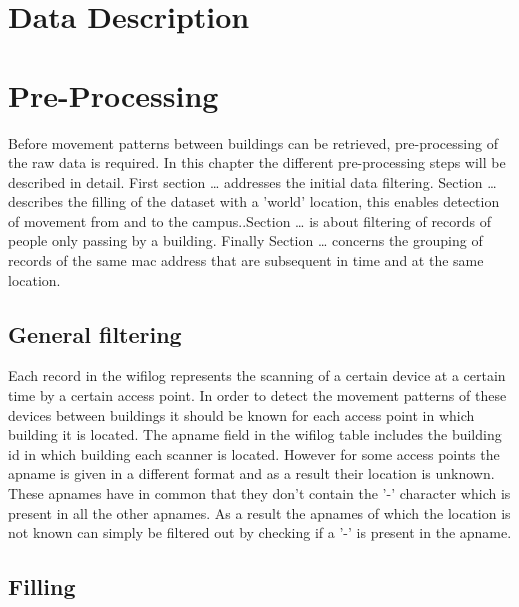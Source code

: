 \section{Data Description}\label{datadescr}


\section{Pre-Processing}\label{preprocessing}
Before movement patterns between buildings can be retrieved, pre-processing of the raw data is required. In this chapter the different pre-processing steps will be described in detail. First section … addresses the initial data filtering. Section … describes the filling of the dataset with a 'world' location, this enables detection of movement from and to the campus..Section … is about filtering of records of people only passing by a building. Finally Section … concerns the grouping of records of the same mac address that are subsequent in time and at the same location.
\subsection{General filtering}
Each record in the wifilog represents the scanning of a certain device at a certain time by a certain access point. In order to detect the movement patterns of these devices between buildings it should be known for each access point in which building it is located. The apname field in the wifilog table includes the building id in which building each scanner is located. However for some access points the apname is given in a different format and as a result their location is unknown. These apnames have in common that they don’t contain the '-' character which is present in all the other apnames. As a result the apnames of which the location is not known can simply be filtered out by checking if a '-' is present in the apname. 


\subsection{Filling}

